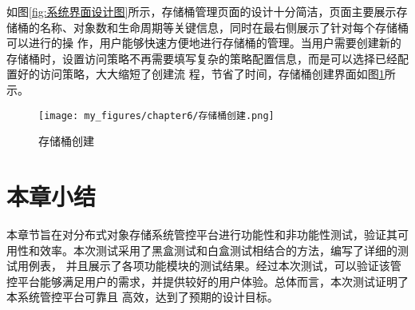 如图\ref{fig:系统界面设计图}所示，存储桶管理页面的设计十分简洁，页面主要展示存储桶的名称、对象数和生命周期等关键信息，同时在最右侧展示了针对每个存储桶可以进行的操
作，用户能够快速方便地进行存储桶的管理。当用户需要创建新的存储桶时，设置访问策略不再需要填写复杂的策略配置信息，而是可以选择已经配置好的访问策略，大大缩短了创建流
程，节省了时间，存储桶创建界面如图\ref{fig:存储桶创建}所示。

\begin{figure}[htb]
    \centering
    \texttt{[image: my\_figures/chapter6/存储桶创建.png]}
    \caption{存储桶创建}
    \label{fig:存储桶创建}
\end{figure}

\section{本章小结}

本章节旨在对分布式对象存储系统管控平台进行功能性和非功能性测试，验证其可用性和效率。本次测试采用了黑盒测试和白盒测试相结合的方法，编写了详细的测试用例表，
并且展示了各项功能模块的测试结果。经过本次测试，可以验证该管控平台能够满足用户的需求，并提供较好的用户体验。总体而言，本次测试证明了本系统管控平台可靠且
高效，达到了预期的设计目标。